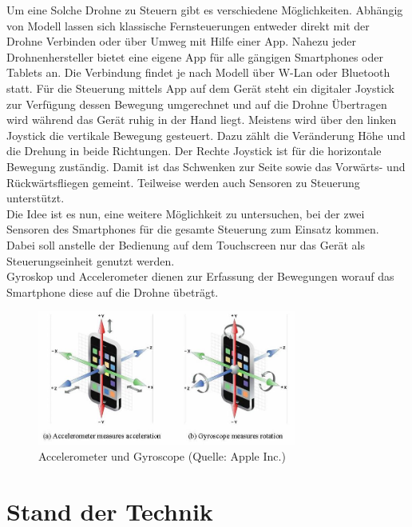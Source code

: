 \documentclass{article}
\begin{document}
Um eine Solche Drohne zu Steuern gibt es verschiedene Möglichkeiten. Abhängig von Modell lassen sich klassische Fernsteuerungen entweder direkt mit der Drohne Verbinden oder über Umweg mit Hilfe einer App. Nahezu jeder Drohnenhersteller bietet eine eigene App für alle gängigen Smartphones oder Tablets an. Die Verbindung findet je nach Modell über W-Lan oder Bluetooth statt. Für die Steuerung mittels App auf dem Gerät steht ein digitaler Joystick zur Verfügung dessen Bewegung umgerechnet und auf die Drohne Übertragen wird während das Gerät ruhig in der Hand liegt. Meistens wird über den linken Joystick die vertikale Bewegung gesteuert. Dazu zählt die Veränderung Höhe und die Drehung in beide Richtungen. Der Rechte Joystick ist für die horizontale Bewegung zuständig. Damit ist das Schwenken zur Seite sowie das Vorwärts- und Rückwärtsfliegen gemeint. Teilweise werden auch Sensoren zu Steuerung unterstützt.
\\ Die Idee ist es nun, eine weitere Möglichkeit zu untersuchen, bei der zwei Sensoren des Smartphones für die gesamte Steuerung zum Einsatz kommen. Dabei soll anstelle der Bedienung auf dem Touchscreen nur das Gerät als Steuerungseinheit genutzt werden. \\Gyroskop und Accelerometer dienen zur Erfassung der Bewegungen worauf das Smartphone diese auf die Drohne übeträgt. 
\begin{figure}[htb]
\begin{minipage}[b]{1.0\linewidth}
  \centering
\centerline{\includegraphics[width= 85mm]{gyro.jpg}}
\end{minipage}
\caption{Accelerometer und Gyroscope (Quelle: Apple Inc.)}
\label{fig:gyro}
\end{figure}


\section{Stand der Technik}
\label{sec:verwandteArbeiten}
\end{document}
